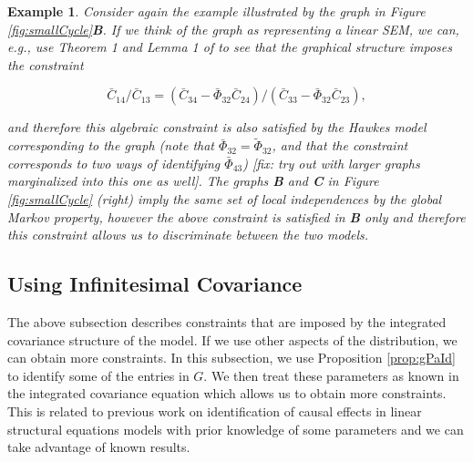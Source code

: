 \documentclass[accepted]{uai2021} %
\newtheorem{exmp}[thm]{Example}
\begin{document}
\begin{exmp}
	\label{exmp:eqSmallCycle}
	Consider again the example illustrated by the graph in Figure 
	\ref{fig:smallCycle}\textbf{B}. If we think of the graph as representing a 
	linear SEM, we can, e.g., use Theorem 1 and Lemma 1 of \cite{chen2014} to 
	see that the graphical structure imposes the constraint 
	
	$$\bar{C}_{14}/\bar{C}_{13} = (\bar{C}_{34} - 
	\bar{\Phi}_{32}\bar{C}_{24})/(\bar{C}_{33} - 
	\bar{\Phi}_{32}\bar{C}_{23}),$$ 
	
	and 
	therefore this algebraic constraint is also satisfied by the Hawkes model 
	corresponding to the graph (note that $\bar{\Phi}_{32} = 
	\tilde{\Phi}_{32}$, and that the constraint corresponds to
	two ways of identifying $\bar{\Phi}_{43}$) 
	[fix: try out with larger graphs marginalized 
	into this one as well]. The graphs \textbf{B} and \textbf{C} in Figure 
	\ref{fig:smallCycle} (right) 
	imply the same set of local independences
	by the global Markov property, however the above constraint is satisfied in 
	\textbf{B} only and therefore this constraint allows us to 
	discriminate between the two models.
\end{exmp}


\subsection{Using Infinitesimal Covariance}
\label{ssec:eqInfCov}

The above subsection describes constraints that are imposed by the integrated 
covariance structure of the model. If we use other aspects of the distribution, 
we can obtain more constraints. In this subsection, we use Proposition 
\ref{prop:gPaId} to identify some of the entries in $G$. We then treat these 
parameters as known in the integrated covariance equation which allows us to 
obtain more constraints. This is related to previous work on identification of 
causal effects in linear structural equations models with prior knowledge of 
some parameters and we can take advantage of known results.
\end{document}
